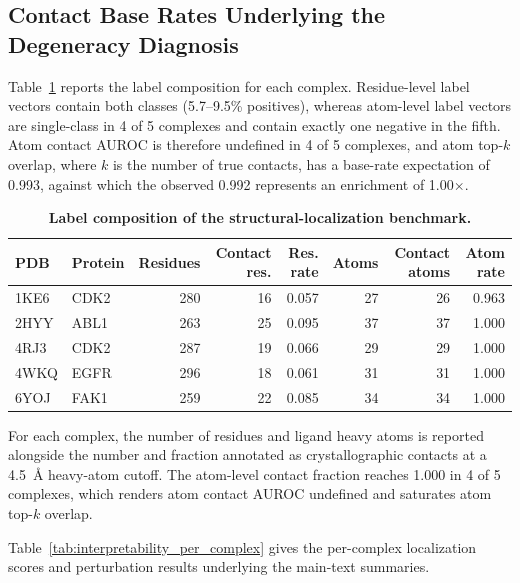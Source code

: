 \documentclass[11pt]{article}
\newenvironment{smalltable}%
{\begin{table}[!htbp]\centering\begingroup\setlength{\tabcolsep}{3pt}\renewcommand{\arraystretch}{1.1}\footnotesize}%
{\endgroup\end{table}}
\begin{document}
\subsection{Contact Base Rates Underlying the Degeneracy Diagnosis}
Table~\ref{tab:base_rates} reports the label composition for each complex. Residue-level label vectors contain both classes (5.7--9.5\% positives), whereas atom-level label vectors are single-class in 4 of 5 complexes and contain exactly one negative in the fifth. Atom contact AUROC is therefore undefined in 4 of 5 complexes, and atom top-$k$ overlap, where $k$ is the number of true contacts, has a base-rate expectation of 0.993, against which the observed 0.992 represents an enrichment of 1.00$\times$.

\begin{smalltable}
\caption{\textbf{Label composition of the structural-localization benchmark.}}
\label{tab:base_rates}
\begin{tabular}{llrrrrrr}
\toprule
PDB & Protein & Residues & Contact res. & Res. rate & Atoms & Contact atoms & Atom rate \\
\midrule
1KE6 & CDK2   & 280 & 16 & 0.057 & 27 & 26 & 0.963 \\
2HYY & ABL1   & 263 & 25 & 0.095 & 37 & 37 & 1.000 \\
4RJ3 & CDK2   & 287 & 19 & 0.066 & 29 & 29 & 1.000 \\
4WKQ & EGFR   & 296 & 18 & 0.061 & 31 & 31 & 1.000 \\
6YOJ & FAK1   & 259 & 22 & 0.085 & 34 & 34 & 1.000 \\
\bottomrule
\end{tabular}
\par\vspace{3pt}
\begin{minipage}{\linewidth}\footnotesize\raggedright
For each complex, the number of residues and ligand heavy atoms is reported alongside the number and fraction annotated as crystallographic contacts at a 4.5~\AA{} heavy-atom cutoff. The atom-level contact fraction reaches 1.000 in 4 of 5 complexes, which renders atom contact AUROC undefined and saturates atom top-$k$ overlap.
\end{minipage}
\end{smalltable}

Table~\ref{tab:interpretability_per_complex} gives the per-complex localization scores
and perturbation results underlying the main-text summaries.
\end{document}
